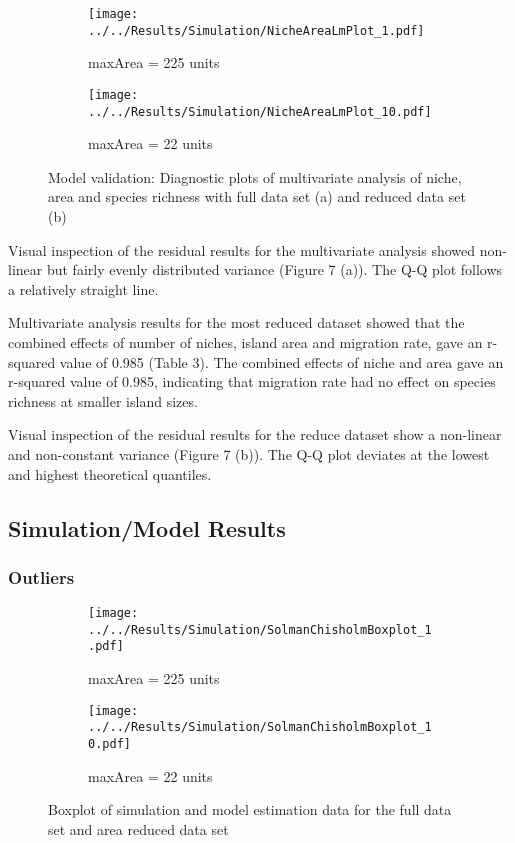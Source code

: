\documentclass{article}
\begin{document}
\begin{figure}[h!]
  \centering
  \begin{subfigure}[b]{0.4\linewidth}
    \texttt{[image: ../../Results/Simulation/NicheAreaLmPlot\_1.pdf]}
    \caption{maxArea = 225 units}
  \end{subfigure}
  \begin{subfigure}[b]{0.4\linewidth}
    \texttt{[image: ../../Results/Simulation/NicheAreaLmPlot\_10.pdf]}
    \caption{maxArea = 22 units}
  \end{subfigure}
  \caption{Model validation: Diagnostic plots of multivariate analysis of niche, area and species richness with full data set (a) and reduced data set (b)}
  \label{fig:Model validation multivariate 2}
\end{figure}


Visual inspection of the residual results for the multivariate analysis showed non-linear but fairly evenly distributed variance (Figure 7 (a)). The Q-Q plot follows a relatively straight line. \bigskip

Multivariate analysis results for the most reduced dataset showed that the combined effects of number of niches, island area and migration rate, gave an r-squared value of 0.985 (Table 3). The combined effects of niche and area gave an r-squared value of 0.985, indicating that migration rate had no effect on species richness at smaller island sizes. \bigskip

Visual inspection of the residual results for the reduce dataset show a non-linear and non-constant variance (Figure 7 (b)). The Q-Q plot deviates at the lowest and highest theoretical quantiles.   

\subsection{Simulation/Model Results}

\subsubsection{Outliers}

\begin{figure}[h!]
  \centering
  \begin{subfigure}[b]{0.4\linewidth}
    \texttt{[image: ../../Results/Simulation/SolmanChisholmBoxplot\_1.pdf]}
    \caption{maxArea = 225 units}
  \end{subfigure}
  \begin{subfigure}[b]{0.4\linewidth}
    \texttt{[image: ../../Results/Simulation/SolmanChisholmBoxplot\_10.pdf]}
    \caption{maxArea = 22 units}
  \end{subfigure}
  \caption{Boxplot of simulation and model estimation data for the full data set and area reduced data set}
  \label{fig:boxplots}
\end{figure}
\end{document}
